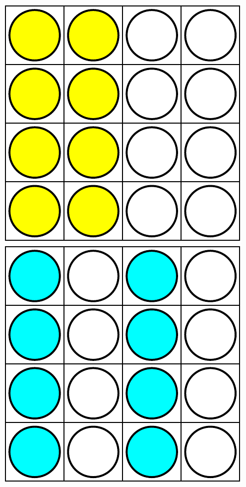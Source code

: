 \documentclass{uebungszettel}
\begin{document}
\begin{center}
 \includegraphics[scale = 0.4]{zerlegung1}\hspace*{3 mm}
 \includegraphics[scale = 0.4]{zerlegung2}\hspace*{3 mm}

\end{center}
\end{document}

